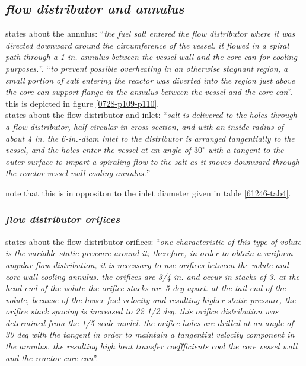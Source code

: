 \documentclass[ms,a4paper]{memoir}
\begin{document}
\subsection{\emph{flow distributor and annulus}}
\textcite[page 112 and 114]{ornl-tm-3039} states about the annulus:
\enquote{\textit{the fuel salt entered the flow distributor where it was directed downward around the circumference of the vessel. it flowed in a spiral path through a 1-in. annulus between the vessel wall and the core can for cooling purposes.}}. \enquote{\textit{to prevent possible overheating in an otherwise stagnant region, a small portion of salt entering the reactor was diverted into the region just above the core can support flange in the annulus between the vessel and the core can}}.
this is depicted in figure \ref{0728-p109-p110}. \\

\parencite[page 108]{ornl-tm-0728} states about the flow distributor and inlet:
\enquote{\textit{salt is delivered to the holes through a flow distributor, half-circular in cross section, and with an inside radius of about 4 in. the 6-in.-diam inlet to the distributor is arranged tangentially to the vessel, and the holes enter the vessel at an angle of $30^\circ$ with a tangent to the outer surface to impart a spiraling flow to the salt as it moves downward through the reactor-vessel-wall cooling annulus.}}

note that this is in oppositon to the inlet diameter given in table \ref{61246-tab4}.

\subsubsection{\emph{flow distributor orifices}}
\textcite[page 9-10]{ornl-tm-3229} states about the flow distributor orifices:
\enquote{\textit{one characteristic of this type of volute is the variable static pressure around it; therefore, in order to obtain a uniform angular flow distribution, it is necessary to use orifices between the volute and core wall cooling annulus. the orifices are 3/4 in. and occur in stacks of 3. at the head end of the volute the orifice stacks are 5 deg apart. at the tail end of the volute, because of the lower fuel velocity and resulting higher static pressure, the orifice stack spacing is increased to 22 1/2 deg. this orifice distribution was determined from the 1/5 scale model. the orifice holes are drilled at an angle of 30 deg with the tangent in order to maintain a tangential velocity component in the annulus. the resulting high heat transfer coeffficients cool the core vessel wall and the reactor core can}}.
\end{document}
